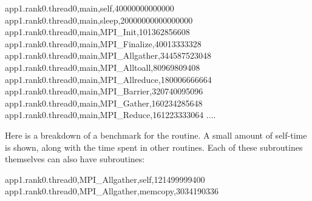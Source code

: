 \begin{ViFile}
app1.rank0.thread0,main,self,40000000000000
app1.rank0.thread0,main,sleep,20000000000000000
app1.rank0.thread0,main,MPI_Init,101362856608
app1.rank0.thread0,main,MPI_Finalize,40013333328
app1.rank0.thread0,main,MPI_Allgather,344587523048
app1.rank0.thread0,main,MPI_Alltoall,80969809408
app1.rank0.thread0,main,MPI_Allreduce,180006666664
app1.rank0.thread0,main,MPI_Barrier,320740095096
app1.rank0.thread0,main,MPI_Gather,160234285648
app1.rank0.thread0,main,MPI_Reduce,161223333064
....
\end{ViFile}
Here is a breakdown of a benchmark for the  routine.
A small amount of self-time is shown, along with the time spent in other routines.
Each of these subroutines themselves can also have subroutines:

\begin{ViFile}
app1.rank0.thread0,MPI_Allgather,self,121499999400
app1.rank0.thread0,MPI_Allgather,memcopy,3034190336
\end{ViFile}


